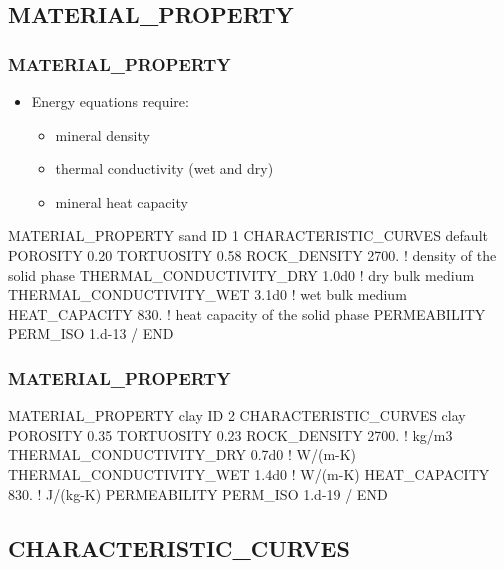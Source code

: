 \documentclass{beamer}
\newcommand\redcomment[1]{{{\color{red} #1}}}
\newcommand\bluecomment[1]{{{\color{blue} #1}}}
\begin{document}
\subsection{MATERIAL\_PROPERTY}

\begin{frame}[fragile]\frametitle{MATERIAL\_PROPERTY}
\begin{itemize}
  \item Energy equations require:
  \begin{itemize}
    \item \redcomment{mineral density}
    \item \redcomment{thermal conductivity} (wet and dry)
    \item \redcomment{mineral heat capacity}
  \end{itemize}
\end{itemize}

\begin{semiverbatim}
MATERIAL_PROPERTY sand
  ID 1
  CHARACTERISTIC_CURVES default
  POROSITY 0.20
  TORTUOSITY 0.58
  ROCK_DENSITY 2700. \bluecomment{! density of the solid phase}
  THERMAL_CONDUCTIVITY_DRY 1.0d0 \bluecomment{! dry bulk medium}
  THERMAL_CONDUCTIVITY_WET 3.1d0 \bluecomment{! wet bulk medium}
  HEAT_CAPACITY 830. \bluecomment{! heat capacity of the solid phase}
  PERMEABILITY
    PERM_ISO 1.d-13
  /
END
\end{semiverbatim}

\end{frame}

\begin{frame}[fragile]\frametitle{MATERIAL\_PROPERTY}

\begin{semiverbatim}
MATERIAL_PROPERTY clay
  ID 2
  CHARACTERISTIC_CURVES clay
  POROSITY 0.35
  TORTUOSITY 0.23
  ROCK_DENSITY 2700. \bluecomment{! kg/m3}
  THERMAL_CONDUCTIVITY_DRY 0.7d0 \bluecomment{! W/(m-K)}
  THERMAL_CONDUCTIVITY_WET 1.4d0 \bluecomment{! W/(m-K)}
  HEAT_CAPACITY 830. \bluecomment{! J/(kg-K)}
  PERMEABILITY
    PERM_ISO 1.d-19
  /
END
\end{semiverbatim}

\end{frame}
\subsection{CHARACTERISTIC\_CURVES}
\end{document}
